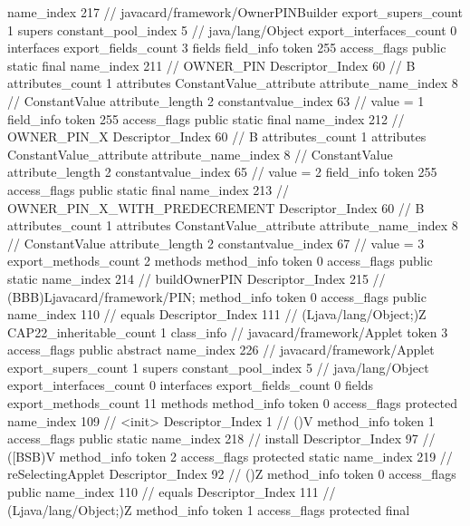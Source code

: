 {{{			name_index	217		// javacard/framework/OwnerPINBuilder
			export_supers_count	1
			supers {
				constant_pool_index	5		// java/lang/Object
			}
			export_interfaces_count	0
			interfaces {
			}
			export_fields_count	3
			fields {
			field_info {
				token	255
				access_flags	public static final
				name_index	211		// OWNER_PIN
				Descriptor_Index	60		// B
				attributes_count	1
				attributes {
				ConstantValue_attribute {
					attribute_name_index	8		// ConstantValue
					attribute_length	2
					constantvalue_index	63		// value = 1
				}
				}
			}
			field_info {
				token	255
				access_flags	public static final
				name_index	212		// OWNER_PIN_X
				Descriptor_Index	60		// B
				attributes_count	1
				attributes {
				ConstantValue_attribute {
					attribute_name_index	8		// ConstantValue
					attribute_length	2
					constantvalue_index	65		// value = 2
				}
				}
			}
			field_info {
				token	255
				access_flags	public static final
				name_index	213		// OWNER_PIN_X_WITH_PREDECREMENT
				Descriptor_Index	60		// B
				attributes_count	1
				attributes {
				ConstantValue_attribute {
					attribute_name_index	8		// ConstantValue
					attribute_length	2
					constantvalue_index	67		// value = 3
				}
				}
			}
			}
			export_methods_count	2
			methods {
				method_info {
					token	0
					access_flags	public static
					name_index	214		// buildOwnerPIN
					Descriptor_Index	215		// (BBB)Ljavacard/framework/PIN;
				}
				method_info {
					token	0
					access_flags	public
					name_index	110		// equals
					Descriptor_Index	111		// (Ljava/lang/Object;)Z
				}
			}
			CAP22_inheritable_count	1
		}
		class_info {		// javacard/framework/Applet
			token	3
			access_flags	public abstract
			name_index	226		// javacard/framework/Applet
			export_supers_count	1
			supers {
				constant_pool_index	5		// java/lang/Object
			}
			export_interfaces_count	0
			interfaces {
			}
			export_fields_count	0
			fields {
			}
			export_methods_count	11
			methods {
				method_info {
					token	0
					access_flags	protected
					name_index	109		// <init>
					Descriptor_Index	1		// ()V
				}
				method_info {
					token	1
					access_flags	public static
					name_index	218		// install
					Descriptor_Index	97		// ([BSB)V
				}
				method_info {
					token	2
					access_flags	protected static
					name_index	219		// reSelectingApplet
					Descriptor_Index	92		// ()Z
				}
				method_info {
					token	0
					access_flags	public
					name_index	110		// equals
					Descriptor_Index	111		// (Ljava/lang/Object;)Z
				}
				method_info {
					token	1
					access_flags	protected final
}}}}}
